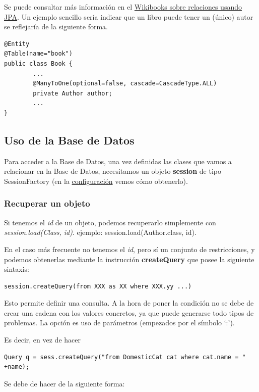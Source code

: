 \documentclass[11pt]{article}
\begin{document}
Se puede consultar más información en el \href{https://en.wikibooks.org/wiki/Java_Persistence/Relationships}{Wikibooks sobre relaciones usando JPA}. 
Un ejemplo sencillo sería indicar que un libro puede tener un (único) autor se reflejaría de la siguiente forma.  


\begin{lstlisting}
@Entity
@Table(name="book")
public class Book {  
        ...
        @ManyToOne(optional=false, cascade=CascadeType.ALL)
        private Author author;
        ...
}
\end{lstlisting}
\subsection{Uso de la Base de Datos}
\label{sec-6-3}




Para acceder a la Base de Datos, una vez definidas las clases que vamos a relacionar en la Base de Datos, necesitamos
un objeto \textbf{session} de tipo SessionFactory (en la \hyperref[sec-6-4]{configuración} vemos cómo obtenerlo). 
\subsubsection{Recuperar un objeto}
\label{sec-6-3-1}




Si tenemos el \emph{id} de un objeto, podemos recuperarlo simplemente con \emph{session.load(Class, id)}. ejemplo:
session.load(Author.class, id).


En el caso más frecuente no tenemos el \emph{id}, pero sí un conjunto de restricciones, y podemos obtenerlas mediante
la instrucción \textbf{createQuery} que posee la siguiente sintaxis:


\begin{lstlisting}
session.createQuery(from XXX as XX where XXX.yy ...)
\end{lstlisting}


Esto permite definir una consulta. A la hora de poner la condición no se debe de crear una cadena con los valores
concretos, ya que puede generarse todo tipos de problemas. La opción es uso de parámetros (empezados por el símbolo `:'). 


Es decir, en vez de hacer
\begin{lstlisting}
Query q = sess.createQuery("from DomesticCat cat where cat.name = " +name);
\end{lstlisting}


Se debe de hacer de la siguiente forma:
\end{document}
